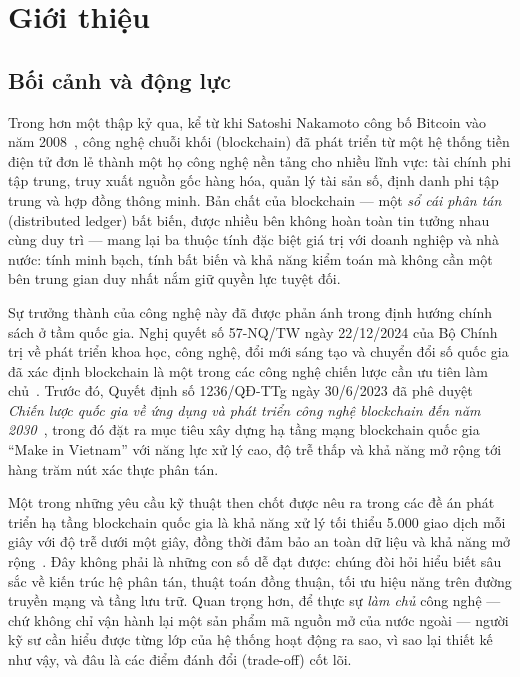 \chapter{Giới thiệu}
\label{chap:introduction}

\section{Bối cảnh và động lực}
\label{sec:background}

Trong hơn một thập kỷ qua, kể từ khi Satoshi Nakamoto công bố Bitcoin vào năm
2008~\cite{nakamoto2008bitcoin}, công nghệ chuỗi khối (blockchain) đã phát triển
từ một hệ thống tiền điện tử đơn lẻ thành một họ công nghệ nền tảng cho nhiều
lĩnh vực: tài chính phi tập trung, truy xuất nguồn gốc hàng hóa, quản lý tài
sản số, định danh phi tập trung và hợp đồng thông minh. Bản chất của blockchain
--- một \textit{sổ cái phân tán} (distributed ledger) bất biến, được nhiều bên
không hoàn toàn tin tưởng nhau cùng duy trì --- mang lại ba thuộc tính đặc biệt
giá trị với doanh nghiệp và nhà nước: tính minh bạch, tính
bất biến và khả năng kiểm toán mà không cần một bên trung gian
duy nhất nắm giữ quyền lực tuyệt đối.

Sự trưởng thành của công nghệ này đã được phản ánh trong định hướng chính sách
ở tầm quốc gia. Nghị quyết số 57-NQ/TW ngày 22/12/2024 của Bộ Chính trị về phát
triển khoa học, công nghệ, đổi mới sáng tạo và chuyển đổi số quốc gia đã xác
định blockchain là một trong các công nghệ chiến lược cần ưu tiên làm
chủ~\cite{nq57}. Trước đó, Quyết định số 1236/QĐ-TTg ngày 30/6/2023 đã phê duyệt
\textit{Chiến lược quốc gia về ứng dụng và phát triển công nghệ blockchain đến
năm 2030}~\cite{qd1236}, trong đó đặt ra mục tiêu xây dựng hạ tầng mạng
blockchain quốc gia ``Make in Vietnam'' với năng lực xử lý cao, độ trễ thấp và
khả năng mở rộng tới hàng trăm nút xác thực phân tán.

Một trong những yêu cầu kỹ thuật then chốt được nêu ra trong các đề án phát
triển hạ tầng blockchain quốc gia là khả năng xử lý tối thiểu 5.000 giao
dịch mỗi giây với độ trễ dưới một giây, đồng thời đảm bảo an toàn dữ liệu và
khả năng mở rộng~\cite{qd1236}. Đây không phải là những con số dễ đạt được:
chúng đòi hỏi hiểu biết sâu sắc về kiến trúc hệ phân tán, thuật toán đồng thuận,
tối ưu hiệu năng trên đường truyền mạng và tầng lưu trữ. Quan trọng hơn, để
thực sự \textit{làm chủ} công nghệ --- chứ không chỉ vận hành lại một sản phẩm
mã nguồn mở của nước ngoài --- người kỹ sư cần hiểu được từng lớp của hệ thống
hoạt động ra sao, vì sao lại thiết kế như vậy, và đâu là các điểm đánh đổi
(trade-off) cốt lõi.

